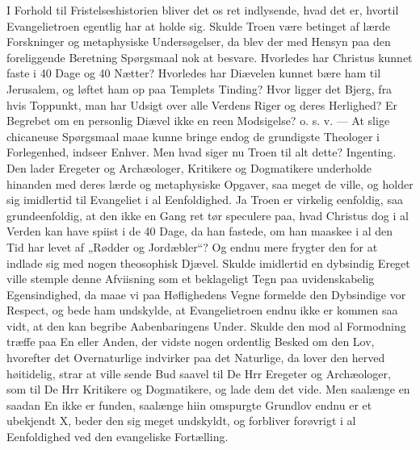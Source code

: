 \documentclass[12pt,a4paper]{book}
\begin{document}
I Forhold til Fristelseshistorien bliver det os ret indlysende, hvad det er, hvortil
Evangelietroen egentlig har at holde sig. Skulde Troen være betinget af lærde
Forskninger og metaphysiske Undersøgelser, da blev der med Hensyn paa den foreliggende
Beretning Spørgsmaal nok at besvare. Hvorledes har Christus kunnet faste i 40 Dage og 40
Nætter? Hvorledes har Diævelen kunnet bære ham til Jerusalem, og løftet ham op paa
Templets Tinding? Hvor ligger det Bjerg, fra hvis Toppunkt, man har Udsigt over alle
Verdens Riger og deres Herlighed? Er Begrebet om en personlig Diævel ikke en reen
Modsigelse? o. s. v. --- At slige chicaneuse Spørgsmaal maae kunne bringe endog de
grundigste Theologer i Forlegenhed, indseer Enhver. Men hvad siger nu Troen til alt
dette? Ingenting. Den lader Eregeter og Archæologer, Kritikere og Dogmatikere underholde
hinanden med deres lærde og metaphysiske Opgaver, saa meget de ville, og holder sig
imidlertid til Evangeliet i al Eenfoldighed. Ja Troen er virkelig eenfoldig, saa
grundeenfoldig, at den ikke en Gang ret tør
speculere paa, hvad Christus dog i al Verden kan have spiist i de 40 Dage, da han
fastede, om han maaskee i al den Tid har levet af „Rødder og Jordæbler“? Og endnu mere
frygter den for at indlade sig med nogen theosophisk Djævel. Skulde imidlertid en
dybsindig Ereget ville stemple denne Afviisning som et beklageligt Tegn paa
uvidenskabelig Egensindighed, da maae vi paa Høflighedens Vegne formelde den Dybsindige
vor Respect, og bede ham undskylde, at Evangelietroen endnu ikke er kommen saa vidt, at
den kan begribe Aabenbaringens Under. Skulde den mod al Formodning træffe paa En eller
Anden, der vidste nogen ordentlig Besked om den Lov, hvorefter det Overnaturlige
indvirker paa det Naturlige, da lover den herved høitidelig, strar at ville sende Bud
saavel til De Hrr Eregeter og Archæologer, som til De Hrr Kritikere og Dogmatikere, og
lade dem det vide. Men saalænge en saadan En ikke er funden, saalænge hiin omspurgte
Grundlov endnu er et ubekjendt X, beder den sig meget undskyldt, og forbliver forøvrigt
i al Eenfoldighed ved den evangeliske Fortælling.
\end{document}
